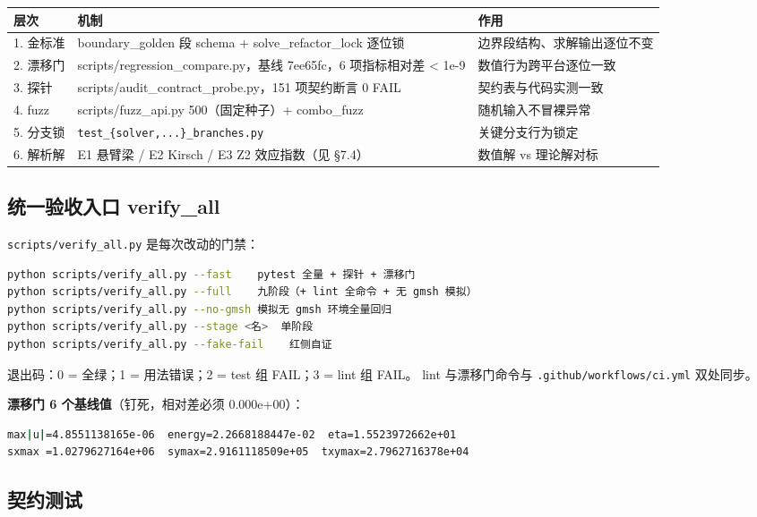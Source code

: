 \documentclass[12pt,a4paper]{ctexart}
\newcommand{\fem}{\Verb}
\begin{document}
\begin{longtable}{p{2.0cm}p{6.4cm}p{6.2cm}}
\toprule
\textbf{层次} & \textbf{机制} & \textbf{作用} \\
\midrule
1. 金标准 & boundary\_golden 段 schema + solve\_refactor\_lock 逐位锁 & 边界段结构、求解输出逐位不变 \\
2. 漂移门 & scripts/regression\_compare.py，基线 7ee65fc，6 项指标相对差 < 1e-9 & 数值行为跨平台逐位一致 \\
3. 探针 & scripts/audit\_contract\_probe.py，151 项契约断言 0 FAIL & 契约表与代码实测一致 \\
4. fuzz & scripts/fuzz\_api.py 500（固定种子）+ combo\_fuzz & 随机输入不冒裸异常 \\
5. 分支锁 & \texttt{test\_\{solver,...\}\_branches.py} & 关键分支行为锁定 \\
6. 解析解 & E1 悬臂梁 / E2 Kirsch / E3 Z2 效应指数（见 §7.4） & 数值解 vs 理论解对标 \\
\bottomrule
\end{longtable}

\subsection{统一验收入口 verify\_all}

\fem|scripts/verify_all.py| 是每次改动的门禁：

\begin{lstlisting}[language=bash]
python scripts/verify_all.py --fast    pytest 全量 + 探针 + 漂移门
python scripts/verify_all.py --full    九阶段（+ lint 全命令 + 无 gmsh 模拟）
python scripts/verify_all.py --no-gmsh 模拟无 gmsh 环境全量回归
python scripts/verify_all.py --stage <名>  单阶段
python scripts/verify_all.py --fake-fail    红侧自证
\end{lstlisting}

退出码：0 = 全绿；1 = 用法错误；2 = test 组 FAIL；3 = lint 组 FAIL。
lint 与漂移门命令与 \fem|.github/workflows/ci.yml| 双处同步。

\textbf{漂移门 6 个基线值}（钉死，相对差必须 0.000e+00）：

\begin{lstlisting}[language=bash]
max|u|=4.8551138165e-06  energy=2.2668188447e-02  eta=1.5523972662e+01
sxmax =1.0279627164e+06  symax=2.9161118509e+05  txymax=2.7962716378e+04
\end{lstlisting}

\subsection{契约测试}
\end{document}
